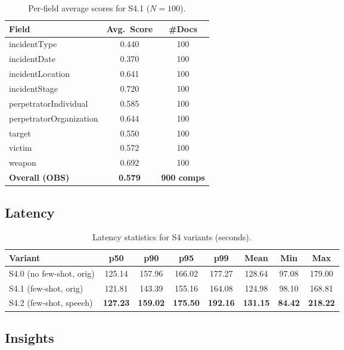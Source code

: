 \begin{table}[H]
    \centering
    \caption{Per-field average scores for S4.1 ($N{=}100$).}
    \label{tab:s4-perfield}
    \begin{tabular}{lcc}
        \toprule
        Field & Avg.\ Score & \#Docs \\
        \midrule
        incidentType & 0.440 & 100 \\
        incidentDate & 0.370 & 100 \\
        incidentLocation & 0.641 & 100 \\
        incidentStage & 0.720 & 100 \\
        perpetratorIndividual & 0.585 & 100 \\
        perpetratorOrganization & 0.644 & 100 \\
        target & 0.550 & 100 \\
        victim & 0.572 & 100 \\
        weapon & 0.692 & 100 \\
        \midrule
        \textbf{Overall (OBS)} & \textbf{0.579} & \textbf{900 comps} \\
        \bottomrule
    \end{tabular}
\end{table}

\subsection*{Latency}

\begin{table}[H]
    \centering
    \caption{Latency statistics for S4 variants (seconds).}
    \label{tab:s4-latency-all}
    \begin{tabular}{lccccccc}
        \toprule
        Variant & p50 & p90 & p95 & p99 & Mean & Min & Max \\
        \midrule
        S4.0 (no few-shot, orig) & 125.14 & 157.96 & 166.02 & 177.27 & 128.64 & 97.08 & 179.00 \\
        S4.1 (few-shot, orig)    & 121.81 & 143.39 & 155.16 & 164.08 & 124.98 & 98.10 & 168.81 \\
        S4.2 (few-shot, speech)  & \textbf{127.23} & \textbf{159.02} & \textbf{175.50} & \textbf{192.16} & \textbf{131.15} & \textbf{84.42} & \textbf{218.22} \\
        \bottomrule
    \end{tabular}
\end{table}

\subsection*{Insights}

